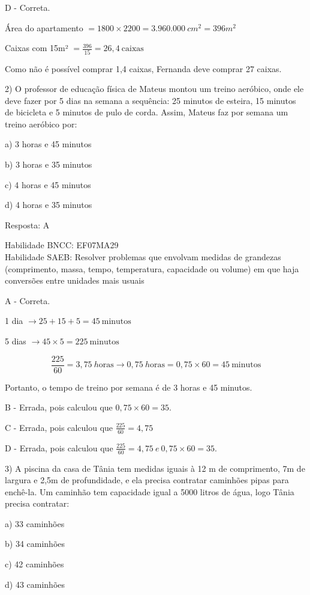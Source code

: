 D - Correta.

Área do apartamento \(= 1800 \times 2200 = 3.960.000\ cm^{2} = 396m^2\)

Caixas com 15m² \(= \frac{396}{15} = 26,4\ \text{caixas}\)

Como não é possível comprar 1,4 caixas, Fernanda deve comprar 27 caixas.

2) O professor de educação física de Mateus montou um treino aeróbico,
onde ele deve fazer por 5 dias na semana a sequência: 25 minutos de
esteira, 15 minutos de bicicleta e 5 minutos de pulo de corda. Assim,
Mateus faz por semana um treino aeróbico por:

a) 3 horas e 45 minutos

b) 3 horas e 35 minutos

c) 4 horas e 45 minutos

d) 4 horas e 35 minutos

Resposta: A

Habilidade BNCC: EF07MA29\\
Habilidade SAEB: Resolver problemas que envolvam medidas de grandezas
(comprimento, massa, tempo, temperatura, capacidade ou volume) em que
haja conversões entre unidades mais usuais

A - Correta.

1 dia \(\rightarrow 25 + 15 + 5 = 45\ \text{minutos}\)

5 dias \(\rightarrow 45 \times 5 = 225\ \text{minutos}\)

\[\frac{225}{60} = 3,75\ h\text{oras} \rightarrow 0,75\ h\text{oras} = 0,75 \times 60 = 45\ \text{minutos}\]

Portanto, o tempo de treino por semana é de 3 horas e 45 minutos.

B - Errada, pois calculou que \(0,75 \times 60 = 35\).

C - Errada, pois calculou que \(\frac{225}{60} = 4,75\)

D - Errada, pois calculou que
\(\frac{225}{60} = 4,75\ e\ 0,75 \times 60 = 35\).

3) A piscina da casa de Tânia tem medidas iguais à 12 m de comprimento,
7m de largura e 2,5m de profundidade, e ela precisa contratar caminhões
pipas para enchê-la. Um caminhão tem capacidade igual a 5000 litros de
água, logo Tânia precisa contratar:

a) 33 caminhões

b) 34 caminhões

c) 42 caminhões

d) 43 caminhões

